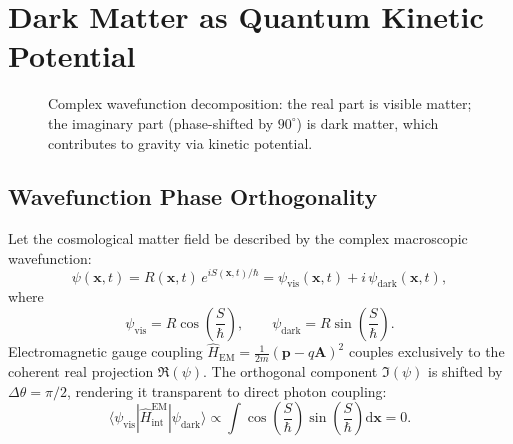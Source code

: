 \documentclass[11pt, a4paper, twocolumn]{article}
\theoremstyle{plain}
\theoremstyle{definition}
\begin{document}
\section{Dark Matter as Quantum Kinetic Potential}
\label{sec:dm}

\begin{figure}[h]
\centering
{}
\caption{Complex wavefunction decomposition: the real part is visible matter; the imaginary part (phase-shifted by $90^\circ$) is dark matter, which contributes to gravity via kinetic potential.}
\label{fig:dm}
\end{figure}

\subsection{Wavefunction Phase Orthogonality}
Let the cosmological matter field be described by the complex macroscopic wavefunction:
\[
\psi(\mathbf{x}, t) = R(\mathbf{x}, t) \, e^{i S(\mathbf{x}, t) / \hbar} = \psi_{\mathrm{vis}}(\mathbf{x}, t) + i \, \psi_{\mathrm{dark}}(\mathbf{x}, t),
\]
where
\[
\psi_{\mathrm{vis}} = R \cos\left(\frac{S}{\hbar}\right), \qquad \psi_{\mathrm{dark}} = R \sin\left(\frac{S}{\hbar}\right).
\]
Electromagnetic gauge coupling $\hat{H}_{\mathrm{EM}} = \frac{1}{2m}(\mathbf{p} - q\mathbf{A})^2$ couples exclusively to the coherent real projection $\Re(\psi)$. The orthogonal component $\Im(\psi)$ is shifted by $\Delta \theta = \pi/2$, rendering it transparent to direct photon coupling:
\[
\langle \psi_{\mathrm{vis}} | \hat{H}_{\mathrm{int}}^{\mathrm{EM}} | \psi_{\mathrm{dark}} \rangle \propto \int \cos\left(\frac{S}{\hbar}\right) \sin\left(\frac{S}{\hbar}\right) \mathrm{d}\mathbf{x} = 0.
\]
\end{document}
